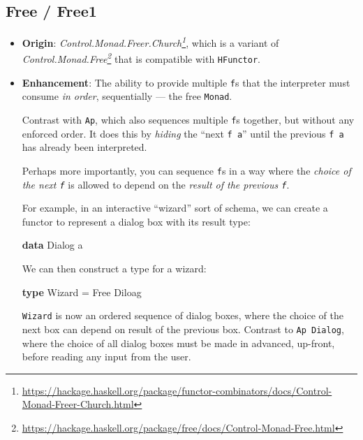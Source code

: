 \documentclass[]{article}
\newenvironment{Shaded}{}{}
\newcommand{\DataTypeTok}[1]{\textcolor[rgb]{0.56,0.13,0.00}{#1}}
\newcommand{\KeywordTok}[1]{\textcolor[rgb]{0.00,0.44,0.13}{\textbf{#1}}}
\newcommand{\NormalTok}[1]{#1}
\newcommand{\OtherTok}[1]{\textcolor[rgb]{0.00,0.44,0.13}{#1}}
\renewcommand{\href}[2]{#2\footnote{\url{#1}}}
\begin{document}
\hypertarget{free-free1}{%
\subsection{Free / Free1}\label{free-free1}}

\begin{itemize}
\item
  \textbf{Origin}:
  \emph{\href{https://hackage.haskell.org/package/functor-combinators/docs/Control-Monad-Freer-Church.html}{Control.Monad.Freer.Church}},
  which is a variant of
  \emph{\href{https://hackage.haskell.org/package/free/docs/Control-Monad-Free.html}{Control.Monad.Free}}
  that is compatible with \texttt{HFunctor}.
\item
  \textbf{Enhancement}: The ability to provide multiple \texttt{f}s that the
  interpreter must consume \emph{in order}, sequentially --- the free
  \texttt{Monad}.

  Contrast with \texttt{Ap}, which also sequences multiple \texttt{f}s together,
  but without any enforced order. It does this by \emph{hiding} the ``next
  \texttt{f\ a}'' until the previous \texttt{f\ a} has already been interpreted.

  Perhaps more importantly, you can sequence \texttt{f}s in a way where the
  \emph{choice of the next \texttt{f}} is allowed to depend on the \emph{result
  of the previous \texttt{f}}.

  For example, in an interactive ``wizard'' sort of schema, we can create a
  functor to represent a dialog box with its result type:

\begin{Shaded}
\begin{Highlighting}[]
\KeywordTok{data} \DataTypeTok{Dialog}\NormalTok{ a}
\end{Highlighting}
\end{Shaded}

  We can then construct a type for a wizard:

\begin{Shaded}
\begin{Highlighting}[]
\KeywordTok{type} \DataTypeTok{Wizard} \OtherTok{=} \DataTypeTok{Free} \DataTypeTok{Diloag}
\end{Highlighting}
\end{Shaded}

  \texttt{Wizard} is now an ordered sequence of dialog boxes, where the choice
  of the next box can depend on result of the previous box. Contrast to
  \texttt{Ap\ Dialog}, where the choice of all dialog boxes must be made in
  advanced, up-front, before reading any input from the user.


\end{itemize}
\end{document}
